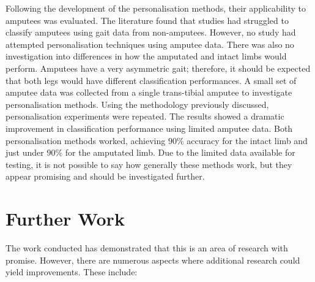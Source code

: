 Following the development of the personalisation methods, their applicability to amputees was evaluated. The literature found that studies had struggled to classify amputees using gait data from non-amputees. However, no study had attempted personalisation techniques using amputee data. There was also no investigation into differences in how the amputated and intact limbs would perform. Amputees have a very asymmetric gait; therefore, it should be expected that both legs would have different classification performances. A small set of amputee data was collected from a single trans-tibial amputee to investigate personalisation methods. Using the methodology previously discussed, personalisation experiments were repeated. The results showed a dramatic improvement in classification performance using limited amputee data. Both personalisation methods worked, achieving $90\%$ accuracy for the intact limb and just under $90\%$ for the amputated limb. Due to the limited data available for testing, it is not possible to say how generally these methods work, but they appear promising and should be investigated further.

\section{Further Work} %
The work conducted has demonstrated that this is an area of research with promise. However, there are numerous aspects where additional research could yield improvements. These include:


